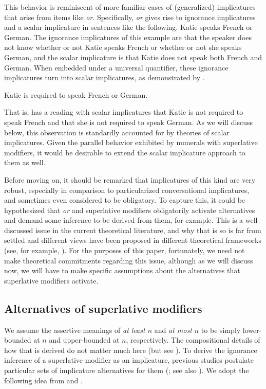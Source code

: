 \documentclass[output=paper]{langscibook}
\begin{document}
This behavior is reminiscent of more familiar cases of (generalized) implicatures that arise from items like \textit{or}. Specifically, \textit{or} gives rise to ignorance implicatures and a scalar implicature in sentences like the following.
\ea Katie speaks French or German.\z
The ignorance implicatures of this example are that the speaker does not know whether or not Katie speaks French or whether or not she speaks German, and the scalar implicature is that Katie does not speak both French and German. When embedded under a universal quantifier, these ignorance implicatures turn into scalar implicatures, as demonstrated by .

\ea Katie is required to speak French or German.\label{don-sud:frgr}\z

\noindent That is,  has a reading with scalar implicatures that Katie is not required to speak French and that she is not required to speak German. As we will discuss below, this observation is standardly accounted for by theories of scalar implicatures. Given the parallel behavior exhibited by numerals with superlative modifiers, it would be desirable to extend the scalar implicature approach to them as well.

Before moving on, it should be remarked that implicatures of this kind are very robust, especially in comparison to particularized conversational implicatures, and sometimes even considered to be obligatory. To capture this, it could be hypothesized that \textit{or} and superlative modifiers obligatorily activate alternatives and demand some inference to be derived from them, for example. This is a well-discussed issue in the current theoretical literature, and why that is so is far from settled and different views have been proposed in different theoretical frameworks (see, for example, \citealt{levinson, magri, schwarz, buccolahaida}).  For the purposes of this paper, fortunately, we need not make theoretical commitments regarding this issue, although as we will discuss now, we will have to make specific assumptions about the alternatives that superlative modifiers activate.

\subsection{Alternatives of superlative modifiers}

We assume the assertive meanings of \textit{at least $n$} and \textit{at most $n$} to be simply lower-bounded at $n$ and upper-bounded at $n$, respectively. The compositional details of how that is derived do not matter much here (but see ). To derive the ignorance inference of a superlative modifier as an implicature, previous studies postulate particular sets of implicature alternatives for them (\citealt{krifka,buring,mayr,schwarz,mendia}; see also \citealt{coppock-brochhagen}). We adopt the following idea from \citet{buring} and \citet{schwarz}.
\end{document}
